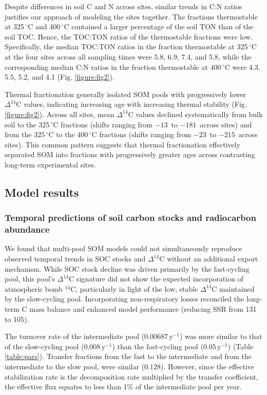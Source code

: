 \documentclass[bg, manuscript]{copernicus}
\begin{document}
Despite differences in soil C and N across sites, similar trends in C:N ratios justifies our approach of modeling the sites together. The fractions thermostable at 325\,$^\circ\text{C}$ and 400\,$^\circ\text{C}$ contained a larger percentage of the soil TON than of the soil TOC. Hence, the TOC:TON ratios of the thermostable fractions were low. Specifically, the median TOC:TON ratios in the fraction thermostable at 325\,$^\circ\text{C}$ at the four sites across all sampling times were 5.8, 6.9, 7.4, and 5.8, while the corresponding median C:N ratios in the fraction thermostable at 400\,$^\circ\text{C}$ were 4.3, 5.5, 5.2, and 4.1 (Fig. \ref{figure:fig2}).

Thermal fractionation generally isolated SOM pools with progressively lower $\Delta^{14}\text{C}$ values, indicating increasing age with increasing thermal stability (Fig. \ref{figure:fig2}). Across all sites, mean $\Delta^{14}\text{C}$ values declined systematically from bulk soil to the 325\,$^\circ\text{C}$ fractions (shifts ranging from $-13$\,\permil{} to $-181$\,\permil{} across sites) and from the 325\,$^\circ\text{C}$ to the 400\,$^\circ\text{C}$ fractions (shifts ranging from $-23$\,\permil{} to $-215$\,\permil{} across sites). This common pattern suggests that thermal fractionation effectively separated SOM into fractions with progressively greater ages across contrasting long-term experimental sites.

\subsection{Model results}

\subsubsection{Temporal predictions of soil carbon stocks and radiocarbon abundance}
We found that multi-pool SOM models could not simultaneously reproduce observed temporal trends in SOC stocks and $\Delta^{14}\text{C}$ without an additional export mechanism. While SOC stock decline was driven primarily by the fast-cycling pool, this pool’s $\Delta^{14}\text{C}$ signature did not show the expected incorporation of atmospheric bomb $^{14}\text{C}$, particularly in light of the low, stable $\Delta^{14}\text{C}$ maintained by the slow-cycling pool. Incorporating non-respiratory losses reconciled the long-term C mass balance and enhanced model performance (reducing SSR from 131 to 105).

The turnover rate of the intermediate pool ($0.00687\,\text{y}^{-1}$) was more similar to that of the slow-cycling pool ($0.008\,\text{y}^{-1}$) than the fast-cycling pool ($0.05\,\text{y}^{-1}$) (Table \ref{table:pars}). Transfer fractions from the fast to the intermediate and from the intermediate to the slow pool, were similar ($0.128$). However, since the effective stabilization rate is the decomposition rate multiplied by the transfer coefficient, the effective flux equates to less than 1\% of the intermediate pool per year.
\end{document}
